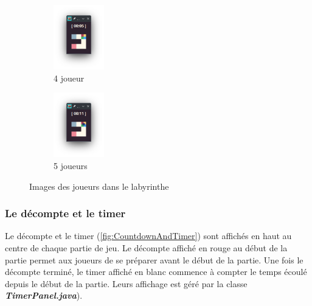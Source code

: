 \begin{figure}[!htb]
\begin{subfigure}{2.2cm}
    \end{subfigure}
    \qquad
    \begin{subfigure}{2.2cm}
        \includegraphics[width=2.2cm]{ressources/Implementation/Labyrinthe/Vue/Players/4Players.png}%
        \caption{4 joueur}
        \label{fig:4Players}
    \end{subfigure}
    \qquad
    \begin{subfigure}{2.2cm}
        \includegraphics[width=2.2cm]{ressources/Implementation/Labyrinthe/Vue/Players/5Players.png}%
        \caption{5 joueurs}
        \label{fig:5Players}
    \end{subfigure}
    \caption{Images des joueurs dans le labyrinthe}
    \label{fig:PlayersInLabyrinth}
\end{figure}
\FloatBarrier

\subsubsection*{Le décompte et le timer}

Le décompte et le timer (\ref{fig:CountdownAndTimer}) sont affichés en haut au centre de chaque partie de jeu. Le décompte affiché en rouge au début de la partie permet aux joueurs de se préparer avant le début de la partie. Une fois le décompte terminé, le timer affiché en blanc commence à compter le temps écoulé depuis le début de la partie. Leurs affichage est géré par la classe \textbf{\textit{TimerPanel.java}}).

